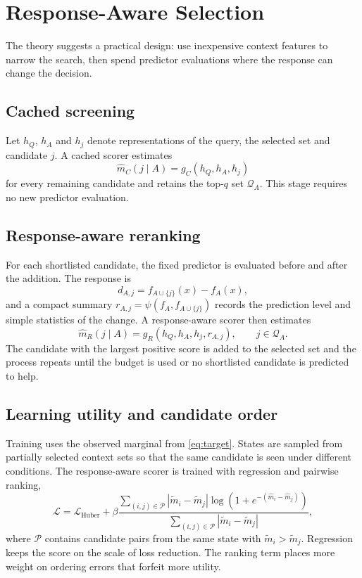 \section{Response-Aware Selection}
\label{sec:adaptive}

The theory suggests a practical design: use inexpensive context features to
narrow the search, then spend predictor evaluations where the response can
change the decision.

\subsection{Cached screening}

Let $h_Q$, $h_A$ and $h_j$ denote representations of the query, the selected
set and candidate $j$. A cached scorer estimates
\begin{equation}
 \widehat m_C(j\mid A)=g_C(h_Q,h_A,h_j)
\end{equation}
for every remaining candidate and retains the top-$q$ set
$\mathcal Q_A$. This stage requires no new predictor evaluation.

\subsection{Response-aware reranking}

For each shortlisted candidate, the fixed predictor is evaluated before and
after the addition. The response is
\begin{equation}
 d_{A,j}=f_{A\cup\{j\}}(x)-f_A(x),
\end{equation}
and a compact summary $r_{A,j}=\psi(f_A,f_{A\cup\{j\}})$ records the
prediction level and simple statistics of the change. A response-aware scorer
then estimates
\begin{equation}
 \widehat m_R(j\mid A)
 =g_R(h_Q,h_A,h_j,r_{A,j}),
 \qquad j\in\mathcal Q_A .
\end{equation}
The candidate with the largest positive score is added to the selected set and
the process repeats until the budget is used or no shortlisted candidate is
predicted to help.

\subsection{Learning utility and candidate order}

Training uses the observed marginal from \cref{eq:target}. States are sampled
from partially selected context sets so that the same candidate is seen under
different conditions. The response-aware scorer is trained with regression and
pairwise ranking,
\begin{equation}
 \mathcal L
 =\mathcal L_{\mathrm{Huber}}
 +\beta
 \frac{\sum_{(i,j)\in\mathcal P}
 |\widetilde m_i-\widetilde m_j|
 \log\!\left(1+e^{-(\widehat m_i-\widehat m_j)}\right)}
 {\sum_{(i,j)\in\mathcal P}|\widetilde m_i-\widetilde m_j|},
 \label{eq:training-loss}
\end{equation}
where $\mathcal P$ contains candidate pairs from the same state with
$\widetilde m_i>\widetilde m_j$. Regression keeps the score on the scale of
loss reduction. The ranking term places more weight on ordering errors that
forfeit more utility.

